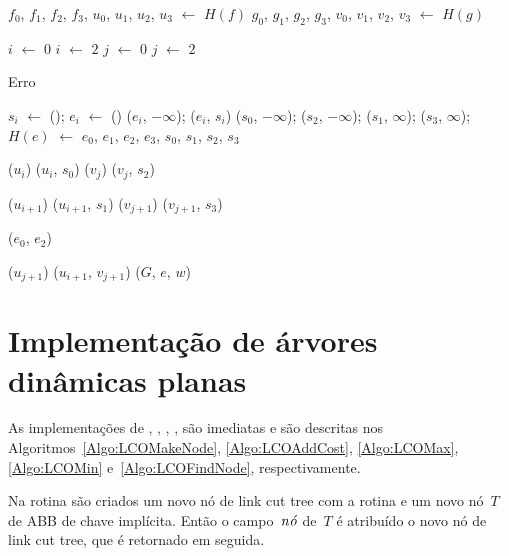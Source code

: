 \begin{algorithm}[htb]
\caption{\MSFaddEdge($G$, $e$, $u$, $f$, $v$, $g$, $w$)}
\label{Algo:MSFaddEdge}
\begin{algorithmic}[1]

\State $f_0$, $f_1$, $f_2$, $f_3$, $u_0$, $u_1$, $u_2$, $u_3$ $\gets$ $H(f)$
\State $g_0$, $g_1$, $g_2$, $g_3$, $v_0$, $v_1$, $v_2$, $v_3$ $\gets$ $H(g)$

  \State $i$ $\gets$ $0$
\Else
  \State $i$ $\gets$ $2$
\EndIf
{}
  \State $j$ $\gets$ $0$
\Else
  \State $j$ $\gets$ $2$
\EndIf

\State \Return Erro
\EndIf



\State $s_i$ $\gets$ \LCOMakeNode(); $e_i$ $\gets$ \LCOMakeNode()
\State  \LCOAddCost($e_i$, $-\infty$);
\State \linkcutAddEdge($e_i$, $s_i$)
\EndFor
\State \LCOAddCost($s_0$, $-\infty$); \LCOAddCost($s_2$, $-\infty$);
\State \LCOAddCost($s_1$, $\infty$); \LCOAddCost($s_3$, $\infty$);
\State $H(e)$ $\gets$ $e_0$, $e_1$, $e_2$, $e_3$, $s_0$, $s_1$, $s_2$, $s_3$

\State \LCOCycle($u_i$)
\State \LCOMerge($u_i$, $s_0$)
\State \LCOCycle($v_j$)
\State \LCOMerge($v_j$, $s_2$)


\State \LCOCycle($u_{i+1}$)
\State \LCOMerge($u_{i+1}$, $s_1$)
\State \LCOCycle($v_{j+1}$)
\State \LCOMerge($v_{j+1}$, $s_3$)

\State \LCOMerge($e_0$, $e_2$)

\State \LCOSplit($u_{j+1}$)
\Else
\State \LCOMerge($u_{i+1}$, $v_{j+1}$)
\EndIf
\State \MSFupdate($G$, $e$, $w$)
\end{algorithmic}
\end{algorithm}

\section{Implementação de árvores dinâmicas planas}
\label{sec:implementacao-ADP}

As implementações de \LCOMakeNode{}, \LCOAddCost{}, \LCOMax{}, \LCOMin, \LCOFindNode{} são imediatas e são descritas nos Algoritmos~\ref{Algo:LCOMakeNode}, \ref{Algo:LCOAddCost}, \ref{Algo:LCOMax}, \ref{Algo:LCOMin} e~\ref{Algo:LCOFindNode}, respectivamente.

Na rotina \LCOMakeNode{} são criados um novo nó de link cut tree com a rotina \linkcutCreate{} e um novo nó~$T$ de ABB de chave implícita.
Então o campo~$\mathit{n\acute{o}}$ de~$T$ é atribuído o novo nó de link cut tree, que é retornado em seguida.

